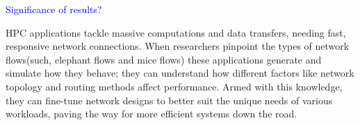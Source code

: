 \textcolor{blue}{Significance of results?}

HPC applications tackle massive computations and data transfers, needing fast, responsive network connections. When researchers pinpoint the types of network flows(such, elephant flows and mice flows) these applications generate and simulate how they behave; they can understand how different factors like network topology and routing methods affect performance. Armed with this knowledge, they can fine-tune network designs to better suit the unique needs of various workloads, paving the way for more efficient systems down the road.

\begin{comment}
 First, HPC applications are often
massively parallelized, with various programming paradigms and libraries such as
Message Passing Interface (MPI) \cite{forum1994mpi}. The huge amount of computation that is
required in the application is divided into smaller computations and runs on
multiple computing nodes. Second, many HPC applications are tightly coupled –
there are dependencies among the parallel processes and the processes need to
communicate with each other during execution. Since many HPC applications
simulate physical phenomena in many iterations, the applications exhibit phased
behavior during execution with alternating communication and computation phases.
Communications in different iterations are often the same or have similar
characteristics. One common communication pattern for HPC applications is
nearest-neighbor where all the ranks which are spatially near each other take
part in communication. 
The main objective of this project is to harness the power of SDN to run HPC applications efficiently.
For HPC applications like the ones in Stencil4D shown in Figure \ref{code.stencil}, SDN
users (HPC application developers, compiler, or communication library) have the
knowledge of whether a communication is an elephant flow or not. The code indicates
that each node sends eight communication messages to its neighbors.
Additionally, since the neighbors are determined only during the compile time
and the set of neighbours do not change during the runtime, the user has the
ability to correctly predict the communication characteristic. 
If the user knows
both the mapping of the ranks to nodes in the HPC system during the running of the
application and also the data sent in the MPI calls, they can determine the
communication characteristics of the application in the actual system, and can
determine which flows are elephants and which are mice when a HPC application

\end{comment}
